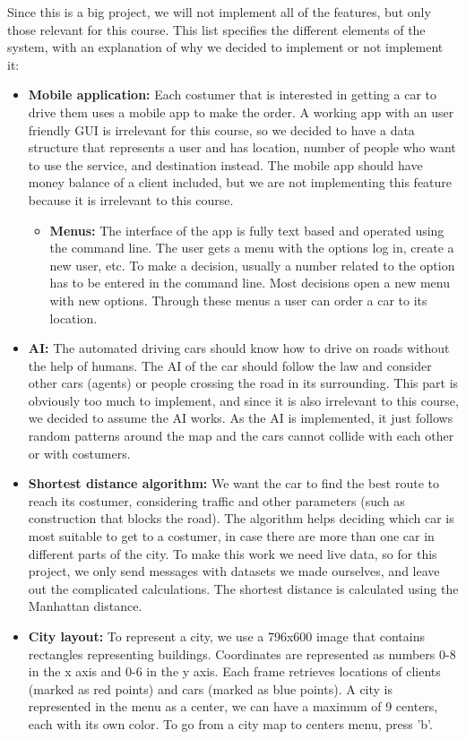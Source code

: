 \documentclass[a4paper]{article}
\begin{document}
Since this is a big project, we will not implement all of the features, but only those relevant for this course. This list specifies the different elements of the system, with an explanation of why we decided to implement or not implement it:
\begin{itemize}
    \item \textbf{Mobile application:} Each costumer that is interested in getting a car to drive them uses a mobile app to make the order. A working app with an user friendly GUI is irrelevant for this course, so we decided to have a data structure that represents a user and has location, number of people who want to use the service, and destination instead. The mobile app should have money balance of a client included, but we are not implementing this feature because it is irrelevant to this course.
    \begin{itemize}
        \item \textbf{Menus:} The interface of the app is fully text based and operated using the command line. The user gets a menu with the options log in, create a new user, etc. To make a decision, usually a number related to the option has to be entered in the command line. Most decisions open a new menu with new options. Through these menus a user can order a car to its location. 
    \end{itemize}
    \item \textbf{AI:} The automated driving cars should know how to drive on roads without the help of humans. The AI of the car should follow the law and consider other cars (agents) or people crossing the road in its surrounding. This part is obviously too much to implement, and since it is also irrelevant to this course, we decided to assume the AI works. As the AI is implemented, it just follows random patterns around the map and the cars cannot collide with each other or with costumers. 
    \item \textbf{Shortest distance algorithm:} We want the car to find the best route to reach its costumer, considering traffic and other parameters (such as construction that blocks the road). The algorithm helps deciding which car is most suitable to get to a costumer, in case there are more than one car in different parts of the city. To make this work we need live data, so for this project, we only send messages with datasets we made ourselves, and leave out the complicated calculations. The shortest distance is calculated using the Manhattan distance.
    \item \textbf{City layout:} To represent a city, we use a 796x600 image that contains rectangles representing buildings. Coordinates are represented as numbers 0-8 in the x axis and 0-6 in the y axis. Each frame retrieves locations of clients (marked as red points) and cars (marked as blue points). A city is represented in the menu as a center, we can have a maximum of 9 centers, each with its own color. To go from a city map to centers menu, press 'b'.

\end{itemize}
\end{document}
